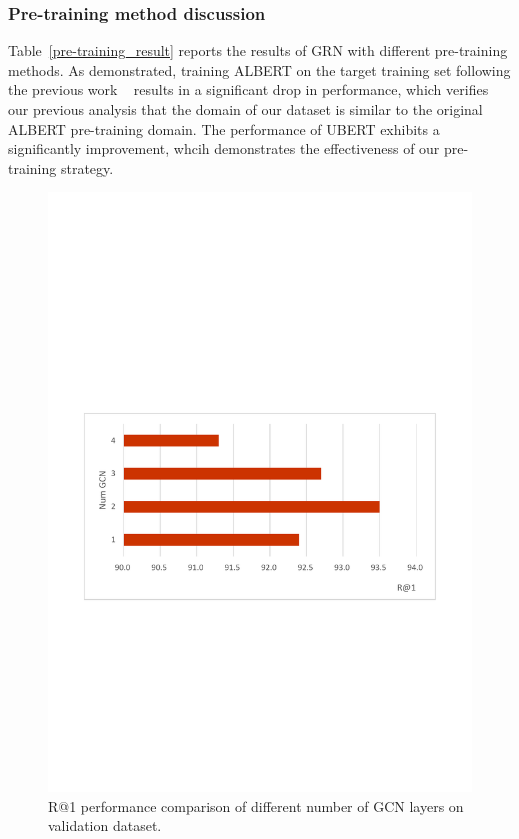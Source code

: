 \documentclass[letterpaper]{article} %
\begin{document}
\subsubsection{Pre-training method discussion}
Table~\ref{pre-training_result} reports the results of GRN with different pre-training methods. As demonstrated, training ALBERT on the target training set following the previous work ~\cite{Lan2020} results in a significant drop in performance, which verifies our previous analysis that the domain of our dataset is similar to the original ALBERT pre-training domain. The performance of UBERT exhibits a significantly improvement, whcih demonstrates the effectiveness of our pre-training strategy.
\begin{figure}[t]
\centering
\includegraphics[width=1\columnwidth]{NGCN}
\caption{R@1 performance comparison of different number of GCN layers on validation dataset.}
\label{NGCN}
\end{figure}
\end{document}
